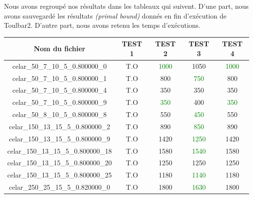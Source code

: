 \documentclass[a4paper, 10pt]{article}
\begin{document}
      Nous avons regroupé nos résultats dans les tableaux qui suivent. D'une part, nous avons sauvegardé les résultats \textit{(primal bound)} donnés en fin d'exécution de Toulbar2. D'autre part, nous avons retenu les temps d'exécutions.

        \begin{minipage}[t]{0.5\linewidth}
          \footnotesize
            \begin{tabular}{| c | c | c| c| c |}
              \hline
              \textbf{Nom du fichier} & \textbf{TEST 1} & \textbf{TEST 2} & \textbf{TEST 3} & \textbf{TEST 4} \\
              \hline
              celar\_50\_7\_10\_5\_0.800000\_0 & \textcolor[gray]{0.6}{T.O}  & \textcolor{green}{1000} & 1050 & \textcolor{green}{1000}  \\
              \hline
              celar\_50\_7\_10\_5\_0.800000\_1 &  \textcolor[gray]{0.6}{T.O} & 800 & \textcolor{green}{750} & 800 \\
              \hline
              celar\_50\_7\_10\_5\_0.800000\_4 & \textcolor[gray]{0.6}{T.O}  & 350 & 350 & 350 \\
              \hline
              celar\_50\_7\_10\_5\_0.800000\_9 & \textcolor[gray]{0.6}{T.O}  & \textcolor{green}{350} & 400  & \textcolor{green}{350}  \\
              \hline
              celar\_50\_8\_10\_5\_0.800000\_8 & \textcolor[gray]{0.6}{T.O} & 550 & \textcolor{green}{450} & 550 \\
              \hline
              celar\_150\_13\_15\_5\_0.800000\_2 & \textcolor[gray]{0.6}{T.O} & 890 & \textcolor{green}{850} & 890\\
              \hline
              celar\_150\_13\_15\_5\_0.800000\_9 & \textcolor[gray]{0.6}{T.O} & 1420 & \textcolor{green}{1250} & 1420 \\
              \hline
              celar\_150\_13\_15\_5\_0.800000\_18 & \textcolor[gray]{0.6}{T.O} & 1580 & \textcolor{green}{1540} & 1580 \\
              \hline
              celar\_150\_13\_15\_5\_0.800000\_20 & \textcolor[gray]{0.6}{T.O} & 1250 & 1250 & 1250\\
              \hline
              celar\_150\_13\_15\_5\_0.800000\_25 & \textcolor[gray]{0.6}{T.O} & 1180 & \textcolor{green}{1140} & 1180 \\
              \hline
              celar\_250\_25\_15\_5\_0.820000\_0 & \textcolor[gray]{0.6}{T.O} & 1800 & \textcolor{green}{1630} & 1800\\

\end{tabular}
\end{minipage}
\end{document}
